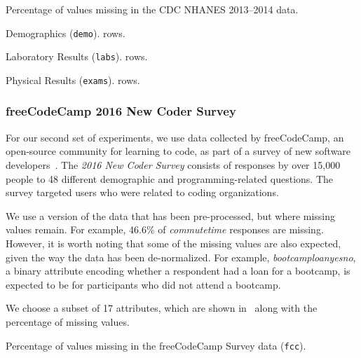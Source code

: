 \begin{table}
  \centering
  \captionsetup{labelfont=bf}
  \caption{Percentage of values missing in the CDC NHANES 2013--2014 data.}\label{table:nhanes-description}
  \captionsetup{labelfont=up}
  \begin{subtable}{0.3\textwidth}
    \centering
    \caption{Demographics (\texttt{demo}). \demorows{} rows.}
    
  \end{subtable}\quad\begin{subtable}{0.3\textwidth}
    \centering
    \caption{Laboratory Results (\texttt{labs}). \labexrows{} rows.}
    
  \end{subtable}\quad\begin{subtable}{0.3\textwidth}
    \centering
    \caption{Physical Results (\texttt{exams}). \labexrows{} rows.}
    
  \end{subtable}
\end{table}

\subsubsection{freeCodeCamp 2016 New Coder Survey}
For our second set of experiments, we use data collected by freeCodeCamp, an open-source
community for learning to code, as part of a survey of new software
developers~\cite{fcc-data}.  The \textit{2016 New Coder Survey} consists of responses by
over 15,000 people to 48 different demographic and programming-related questions.  The
survey targeted users who were related to coding organizations.

We use a version of the data that has been pre-processed, but where missing values remain.
For example, 46.6\% of \textit{commutetime} responses are missing. However, it is worth
noting that some of the missing values are also expected, given the way the data has been
de-normalized. For example, \textit{bootcamploanyesno}, a binary attribute encoding whether
a respondent had a loan for a bootcamp, is expected to be \nullv{} for participants who did not
attend a bootcamp.

We choose a subset of 17 attributes, which are shown in~ along
with the percentage of missing values.

\begin{table}
  \centering
  \captionsetup{labelfont=bf}
  \caption{Percentage of values missing in the freeCodeCamp Survey data (\texttt{fcc}).}\label{table:fcc-description}
  
\end{table}

